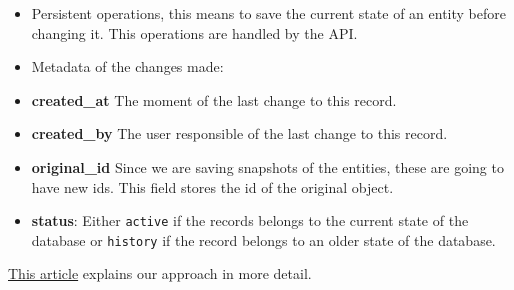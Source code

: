 \begin{itemize}
\item
  Persistent operations, this means to save the current state of an
  entity before changing it. This operations are handled by the API.
\item
  Metadata of the changes made:
\item
  \textbf{created\_at} The moment of the last change to this record.
\item
  \textbf{created\_by} The user responsible of the last change to this
  record.
\item
  \textbf{original\_id} Since we are saving snapshots of the entities,
  these are going to have new ids. This field stores the id of the
  original object.
\item
  \textbf{status}: Either \texttt{active} if the records belongs to the
  current state of the database or \texttt{history} if the record
  belongs to an older state of the database.
\end{itemize}

\href{https://www.codeproject.com/Articles/105768/Audit*Trail\%20-Tracing-Data-Changes-in-Database}{This
article} explains our approach in more detail.
